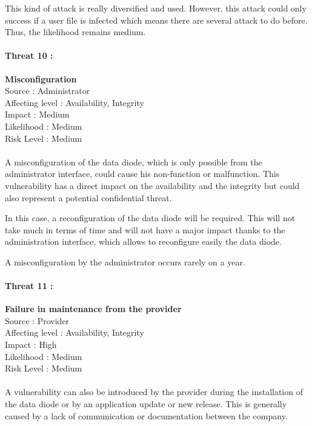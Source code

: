 \documentclass[a4paper,10pt]{article}
\begin{document}
This kind of attack is really diversified and used. However, this attack could only success if a user file is infected which means there are several attack to do before. Thus, the likelihood remains medium. \\

\paragraph{Threat 10 :}  \textbf{Misconfiguration} \\ 
Source : Administrator \\ 
Affecting level : Availability, Integrity \\
Impact : Medium \\
Likelihood : Medium \\
Risk Level : Medium
\paragraph{}A misconfiguration of the data diode, which is only possible from the administrator interface, could cause his non-function or malfunction. This vulnerability has a direct impact on the availability and the integrity but could also represent a potential confidential threat.

In this case, a reconfiguration of the data diode will be required. This will not take much in terms of time and will not have a major impact thanks to the administration interface, which allows to reconfigure easily the data diode. 

A misconfiguration by the administrator occurs rarely on a year.\\

\paragraph{Threat 11 :}  \textbf{Failure in maintenance from the provider} \\ 
Source : Provider \\ 
Affecting level : Availability, Integrity  \\
Impact : High \\
Likelihood : Medium \\
Risk Level : Medium
\paragraph{}A vulnerability can also be introduced by the provider during the installation of the data diode or by an application update or new release. This is generally caused by a lack of communication or documentation between the company.
\end{document}
